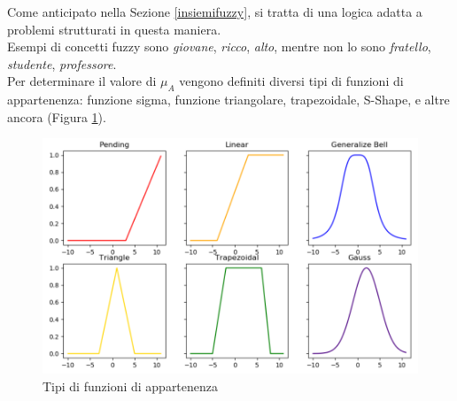 \documentclass[12pt]{report}
\theoremstyle{definition}
\begin{document}
Come anticipato nella Sezione \ref{insiemifuzzy}, si tratta di una logica adatta a problemi strutturati in questa maniera.
\\
Esempi di concetti fuzzy sono \textit{giovane}, \textit{ricco}, \textit{alto}, mentre non lo sono \textit{fratello}, \textit{studente}, \textit{professore}.
\\
Per determinare il valore di $\mu_A$ vengono definiti diversi tipi di funzioni di appartenenza: funzione sigma, funzione triangolare, trapezoidale, S-Shape, e altre ancora (Figura \ref{membership_functions}). 
\\
\begin{figure}[!h]
    \centering
    \includegraphics[scale = 0.7]{images/membership_functions.png}
    \caption{Tipi di funzioni di appartenenza}
    \label{membership_functions}
\end{figure}
\\
\end{document}
